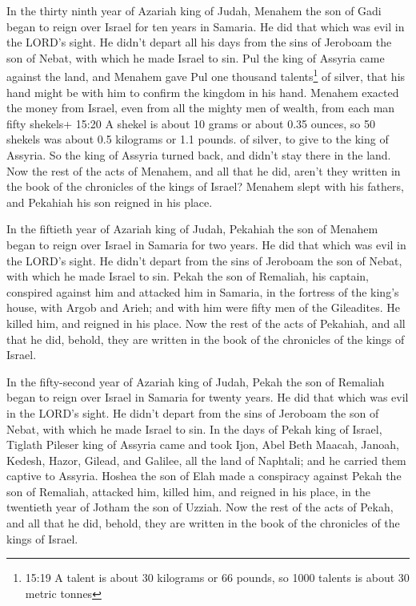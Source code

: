  In the thirty ninth year of Azariah king of Judah, Menahem
the son of Gadi began to reign over Israel for ten years in Samaria.
 He did that which was evil in the LORD's sight. He didn't
depart all his days from the sins of Jeroboam the son of Nebat, with
which he made Israel to sin.  Pul the king of Assyria came
against the land, and Menahem gave Pul one thousand talents\footnote{15:19
  A talent is about 30 kilograms or 66 pounds, so 1000 talents is about
  30 metric tonnes} of silver, that his hand might be with him to
confirm the kingdom in his hand.  Menahem exacted the money
from Israel, even from all the mighty men of wealth, from each man fifty
shekels+ 15:20 A shekel is about 10 grams or about 0.35 ounces, so 50
shekels was about 0.5 kilograms or 1.1 pounds. of silver, to give to the
king of Assyria. So the king of Assyria turned back, and didn't stay
there in the land.  Now the rest of the acts of Menahem,
and all that he did, aren't they written in the book of the chronicles
of the kings of Israel?  Menahem slept with his fathers,
and Pekahiah his son reigned in his place.

 In the fiftieth year of Azariah king of Judah, Pekahiah
the son of Menahem began to reign over Israel in Samaria for two years.
 He did that which was evil in the LORD's sight. He didn't
depart from the sins of Jeroboam the son of Nebat, with which he made
Israel to sin.  Pekah the son of Remaliah, his captain,
conspired against him and attacked him in Samaria, in the fortress of
the king's house, with Argob and Arieh; and with him were fifty men of
the Gileadites. He killed him, and reigned in his place. 
Now the rest of the acts of Pekahiah, and all that he did, behold, they
are written in the book of the chronicles of the kings of Israel.

 In the fifty-second year of Azariah king of Judah, Pekah
the son of Remaliah began to reign over Israel in Samaria for twenty
years.  He did that which was evil in the LORD's sight. He
didn't depart from the sins of Jeroboam the son of Nebat, with which he
made Israel to sin.  In the days of Pekah king of Israel,
Tiglath Pileser king of Assyria came and took Ijon, Abel Beth Maacah,
Janoah, Kedesh, Hazor, Gilead, and Galilee, all the land of Naphtali;
and he carried them captive to Assyria.  Hoshea the son of
Elah made a conspiracy against Pekah the son of Remaliah, attacked him,
killed him, and reigned in his place, in the twentieth year of Jotham
the son of Uzziah.  Now the rest of the acts of Pekah, and
all that he did, behold, they are written in the book of the chronicles
of the kings of Israel.

